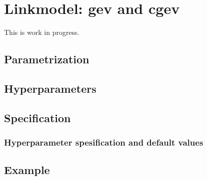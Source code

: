 \documentclass[a4paper,11pt]{article}
\begin{document}
\section*{Linkmodel: gev and cgev}

This is work in progress.

\subsection*{Parametrization}


\subsection*{Hyperparameters}


\subsection*{Specification}

\subsubsection*{Hyperparameter spesification and default values}



\subsection*{Example}

\end{document}
